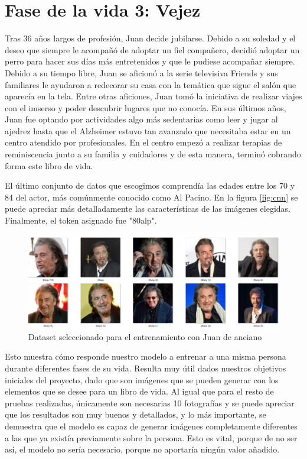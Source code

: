\section{Fase de la vida 3: Vejez}
Tras 36 años largos de profesión, Juan decide jubilarse. Debido a su soledad y el deseo que siempre le acompañó de adoptar un fiel compañero, decidió adoptar un perro para hacer sus días más entretenidos y que le pudiese acompañar siempre. Debido a su tiempo libre, Juan se aficionó a la serie televisiva Friends y sus familiares le ayudaron a redecorar su casa con la temática que sigue el salón que aparecía en la tela. Entre otras aficiones, Juan tomó la iniciativa de realizar viajes con el imserso y poder descubrir lugares que no conocía. En sus últimos años, Juan fue optando por actividades algo más sedentarias como leer y jugar al ajedrez hasta que el Alzheimer estuvo tan avanzado que necesitaba estar en un centro atendido por profesionales. En el centro empezó a realizar terapias de reminiscencia junto a su familia y cuidadores y de esta manera, terminó cobrando forma este libro de vida. 

El último conjunto de datos que escogimos comprendía las edades entre los 70 y 84 del actor, más comúnmente conocido como Al Pacino. En la figura \ref{fig:cnn} se puede apreciar más detalladamente las características de las imágenes elegidas. Finalmente, el token asignado fue "80alp". \\

\begin{figure}[!htb]
	\centering
	\includegraphics[width = 1
	\textwidth]{Imagenes/Vectorial/dataset_80alp.png}
	\caption{Dataset seleccionado para el entrenamiento con Juan de anciano}
	\label{fig:dataset80alp}
\end{figure}



Esto muestra cómo responde nuestro modelo a entrenar a una misma persona durante diferentes fases de su vida. Resulta muy útil dados nuestros objetivos iniciales del proyecto, dado que son imágenes que se pueden generar con los elementos que se desee para un libro de vida. Al igual que para el resto de pruebas realizadas, únicamente son necesarias 10 fotografías y se puede apreciar que los resultados son muy buenos y detallados, y lo más importante, se demuestra que el modelo es capaz de generar imágenes completamente diferentes a las que ya existía previamente sobre la persona. Esto es vital, porque de no ser así, el modelo no sería necesario, porque no aportaría ningún valor añadido.